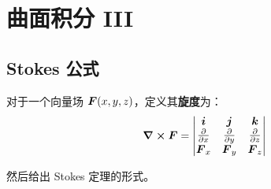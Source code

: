 \section{曲面积分 III}

\subsection{Stokes 公式}

\begin{theorem}
	对于一个向量场 $\boldsymbol{F}(x, y, z)$，定义其\textbf{旋度}为：
	$$
	\curl \boldsymbol{F} = \begin{vmatrix}
		\boldsymbol{i} & \boldsymbol{j} & \boldsymbol{k} \\
		\pdv{x} & \pdv{y} & \pdv{z} \\
		\boldsymbol{F}_x & \boldsymbol{F}_y & \boldsymbol{F}_z
	\end{vmatrix}
	$$
\end{theorem}

然后给出 Stokes 定理的形式。

